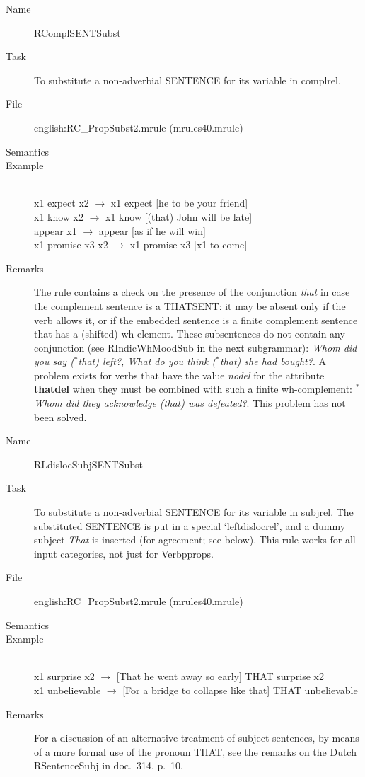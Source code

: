 \begin{description}
\vspace{1 cm}
\begin{description}
\item[Name]   RComplSENTSubst
\item[Task] To substitute a  non-adverbial SENTENCE for its variable in 
complrel. 
\item[File] english:RC\_PropSubst2.mrule (mrules40.mrule)
\item[Semantics]
\item[Example] \mbox{}\\
x1 expect x2 $\rightarrow$ x1 expect [he to be your friend]\\
x1 know x2 $\rightarrow$ x1 know [(that) John will be late]\\
appear x1 $\rightarrow$ appear [as if he will win]\\
x1 promise x3 x2 $\rightarrow$ x1 promise x3 [x1 to come]
\item[Remarks] The rule contains a check on the presence of the conjunction 
{\em that\/} in case the complement sentence is a THATSENT: it may be absent 
only if the verb allows it, or if the embedded sentence is
a finite complement sentence that has a (shifted) wh-element. 
These subsentences do not contain any conjunction (see RIndicWhMoodSub in the 
next subgrammar): {\em Whom did you say ($^{*}$that) left?, What do you think 
($^{*}$that) she had bought?\/}.
A problem exists for verbs that have the value {\em nodel\/} for 
the attribute {\bf thatdel} when they must be combined with such a finite 
wh-complement: {\em $^{*}$Whom did they acknowledge (that) was defeated?\/}.
This problem has not been solved.
\end{description}

\vspace{1 cm}
\begin{description}
\item[Name] RLdislocSubjSENTSubst
\item[Task] To substitute a non-adverbial SENTENCE for its variable in 
subjrel. The substituted SENTENCE is put in a special `leftdislocrel', and a 
dummy subject {\em That\/} is inserted (for agreement; see below). This rule 
works for all input categories, not just for Verbpprops.
\item[File] english:RC\_PropSubst2.mrule (mrules40.mrule)
\item[Semantics]
\item[Example] \mbox{}\\
 x1 surprise x2 $\rightarrow$ [That he went away so early] THAT surprise x2\\
x1 unbelievable $\rightarrow$ [For a bridge to collapse like that] THAT 
unbelievable
\item[Remarks] For a discussion of an alternative treatment of subject 
sentences, by means of a more formal use of the pronoun THAT, see the remarks 
on the Dutch RSentenceSubj in doc.\ 314, p.\ 10.
\end{description}


\end{description}
